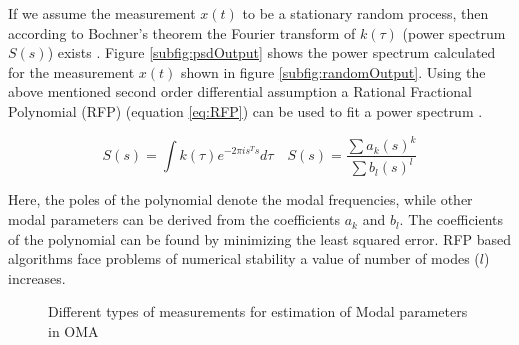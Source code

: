 If we assume the measurement $x(t)$ to be a stationary random process, then according to Bochner's theorem the Fourier transform of $k(\tau)$ (power spectrum $S(s)$) exists \cite{bochner2016lectures}. Figure \ref{subfig:psdOutput} shows the power spectrum calculated for the measurement $x(t)$ shown in figure \ref{subfig:randomOutput}. Using the above mentioned second order differential assumption a Rational Fractional Polynomial (RFP) (equation \ref{eq:RFP}) can be used to fit a power spectrum \cite{richardson1982parameter, allemang1998unified, chauhan2007unified}.

\begin{equation}\label{eq:RFP}
S(s) = \int k(\tau) e^{-2 \pi is^{T} s}d\tau \quad    S(s) = \frac{\sum a_{k}(s)^{k}}{\sum b_{l}(s)^{l}}
\end{equation}

Here, the poles of the polynomial denote the modal frequencies, while other modal parameters can be derived from the coefficients $a_{k}$ and $b_{l}$. The coefficients of the polynomial can be found by minimizing the least squared error. RFP based algorithms face problems of numerical stability a value of number of modes ($l$) increases.

\begin{figure}[!ht]
  \centering
  \quad
  \quad
  
  \caption{Different types of measurements for estimation of Modal parameters in OMA}
\end{figure}

